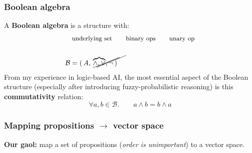 \documentclass[orivec]{llncs}
\newcommand{\tikzmark}[1]{\tikz[overlay,remember picture] \node (#1) {};}
\begin{document}
\subsubsection{Boolean algebra}

A \textbf{Boolean algebra} is a structure with:
\begin{eqnarray}
& \mbox{\footnotesize underlying set} \tikzmark{underSet} \quad \mbox{\footnotesize binary ops} \tikzmark{binaryOps} \quad \mbox{\footnotesize unary op} \tikzmark{unaryOp} \nonumber\\
\nonumber \\
& \mathcal{B} = ( \, \tikzmark{UnderSet} A, \tikzmark{BinaryOps} \overbrace{\wedge, \vee}, \tikzmark{UnaryOp} \neg \, )
\begin{tikzpicture}[overlay,remember picture]
  \draw (underSet.center) +(-35pt,-4pt) -- ([shift={(3pt,11pt)}]UnderSet.center);
  \draw (binaryOps.center) +(-29pt,-3pt) -- ([shift={(13pt,14pt)}]BinaryOps.center);
  \draw (unaryOp.center) +(-30pt,-3pt) -- ([shift={(4pt,11pt)}]UnaryOp.center);
\end{tikzpicture}
\end{eqnarray}
From my experience in logic-based AI, the most essential aspect of the Boolean structure (especially after introducing fuzzy-probabilistic reasoning) is this \textbf{commutativity} relation:
\begin{equation}
\forall a,b \in \mathcal{B}.  \quad \quad a \wedge b = b \wedge a
\end{equation}

\subsubsection{Mapping propositions $\rightarrow$ vector space}

\textbf{Our gaol:} map a set of propositions (\textit{order is unimportant}) to a vector space.
\end{document}
